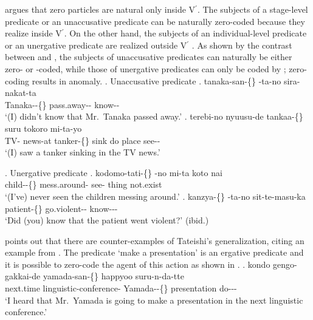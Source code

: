  argues that zero particles are natural only inside V$^{\prime}$.
The subjects of a stage-level predicate or an unaccusative predicate can be naturally zero-coded
because they realize inside V$^{\prime}$.
On the other hand, the subjects of an individual-level predicate or an unergative predicate
are realized outside V$^{\prime}$ \cite[see also][pp.~56--57]{kageyama93}.
As shown by the contrast between \Next and \NNext,
the subjects of unaccusative predicates \Next can naturally be either zero- or -coded,
while those of unergative predicates \NNext can only be coded by ;
zero-coding results in anomaly.
%
\ex. Unaccusative predicate
 \ag. tanaka-san-\{\} -ta-no sira-nakat-ta \\
      Tanaka--\{\} pass.away-- know-- \\
      `(I) didn't know that Mr.~Tanaka passed away.'
 \bg. terebi-no nyuusu-de tankaa-\{\}  suru tokoro mi-ta-yo \\
      TV- news-at tanker-\{\} sink do place see-- \\
      `(I) saw a tanker sinking in the TV news.'
      \hfill{\cite[p.~56]{kageyama93}}

\ex. Unergative predicate
 \ag. kodomo-tati-\{\} -no mi-ta koto nai \\
      child--\{\} mess.around- see- thing not.exist \\
      `(I've) never seen the children messing around.'
 \bg. kanzya-\{\} -ta-no sit-te-masu-ka \\
      patient-\{\} go.violent-- know--- \\
      `Did (you) know that the patient went violent?'
      \hfill{(ibid.)}


 points out that there are counter-examples of Tateishi's generalization,
citing an example from .
The predicate  `make a presentation' is an ergative predicate and it is possible to zero-code the agent of this action
as shown in \Next.
%
\exg. kondo gengo-gakkai-de yamada-san-\{\} happyoo suru-n-da-tte \\
      next.time linguistic-conference- Yamada--\{\} presentation do--- \\
      `I heard that Mr.~Yamada is going to make a presentation in the next linguistic conference.'
      \hfill{\cite[p.~49]{niwa89}}

